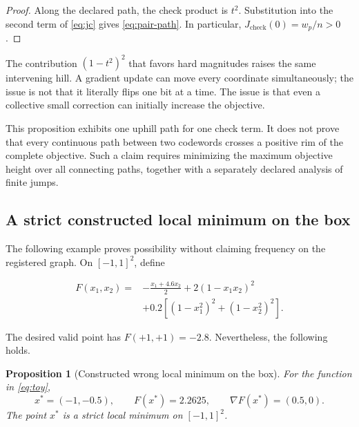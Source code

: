 \documentclass[11pt]{article}
\newtheorem{proposition}{Proposition}
\theoremstyle{remark}
\begin{document}
\begin{proof}
Along the declared path, the check product is $t^2$.  Substitution into the
second term of \cref{eq:jc} gives \cref{eq:pair-path}.  In particular,
$J_{\mathrm{check}}(0)=w_p/n>0$.
\end{proof}

The contribution $(1-t^2)^2$ that favors hard magnitudes raises the same
intervening hill.  A gradient update can move every coordinate simultaneously;
the issue is not that it literally flips one bit at a time.  The issue is that
even a collective small correction can initially increase the objective.

This proposition exhibits one uphill path for one check term.  It does not
prove that every continuous path between two codewords crosses a positive rim
of the complete objective.  Such a claim requires minimizing the maximum
objective height over all connecting paths, together with a separately
declared analysis of finite jumps.

\subsection{A strict constructed local minimum on the box}

The following example proves possibility without claiming frequency on the
registered graph.  On $[-1,1]^2$, define

\begin{equation}
\begin{aligned}
F(x_1,x_2)
={}&-\frac{x_1+4.6x_2}{2}+2(1-x_1x_2)^2\\
&+0.2\left[(1-x_1^2)^2+(1-x_2^2)^2\right].
\end{aligned}
\label{eq:toy}
\end{equation}

The desired valid point has $F(+1,+1)=-2.8$.  Nevertheless, the following
holds.

\begin{proposition}[Constructed wrong local minimum on the box]
For the function in \cref{eq:toy},
\begin{equation}
x^*=(-1,-0.5),\qquad
F(x^*)=2.2625,\qquad
\nabla F(x^*)=(0.5,0).
\end{equation}
The point $x^*$ is a strict local minimum on $[-1,1]^2$.
\end{proposition}
\end{document}
